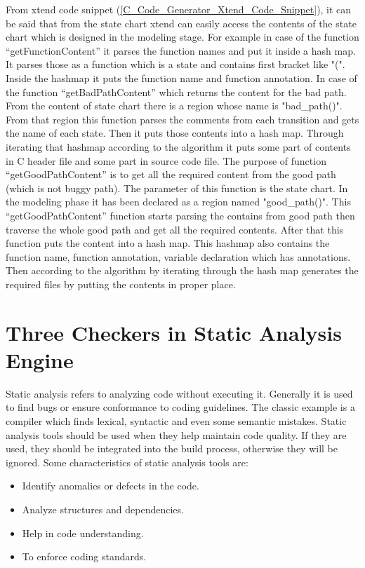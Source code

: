 From xtend code snippet  (\ref{C_Code_Generator_Xtend_Code_Snippet}), it can be said that from the state chart xtend can easily access the contents of the state chart which is designed in the modeling stage. For example in case of the function \enquote{getFunctionContent} it parses the function names and put it inside a hash map. It parses those as a function which is a state and contains first bracket like "(". Inside the hashmap it puts the function name and function annotation. In case of the function \enquote{getBadPathContent} which returns the content for the bad path. From the content of state chart there is a region whose name is "bad\_path()". From that region this function parses the comments from each transition and gets the name of each state. Then it puts those contents into a hash map. Through iterating that hashmap according to the algorithm it puts some part of contents in C header file and some part in source code file. The purpose of function \enquote{getGoodPathContent} is to get all the required content from the good path (which is not buggy path). The parameter of this function is the state chart. In the modeling phase it has been declared as a region named "good\_path()". This \enquote{getGoodPathContent} function starts parsing the contains from good path then traverse the whole good path and get all the required contents. After that this function puts the content into a hash map. This hashmap also contains the function name, function annotation, variable declaration which has annotations. Then according to the algorithm by iterating through the hash map generates the required files by putting the contents in proper place. 

\section{Three Checkers in Static Analysis Engine}
Static analysis refers to analyzing code without executing it. Generally it is used to find bugs or ensure conformance to coding guidelines. The classic example is a compiler which finds lexical, syntactic and even some semantic mistakes. Static analysis tools should be used when they help maintain code quality. If they are used, they should be integrated into the build process, otherwise they will be ignored. Some characteristics of static analysis tools are:
\begin{itemize}	
	\item Identify anomalies or defects in the code.
	\item Analyze structures and dependencies.
	\item Help in code understanding.
	\item To enforce coding standards.
\end{itemize}

